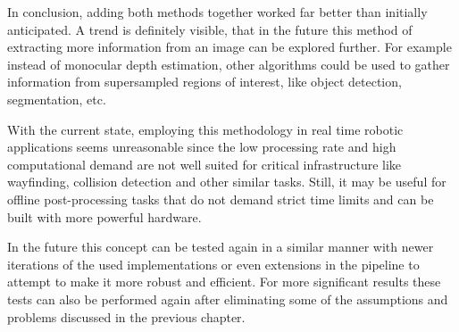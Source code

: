 In conclusion, adding both methods together worked far better than initially anticipated. A trend is definitely visible, that in the future this method of extracting more information from an image can be explored further. For example instead of monocular depth estimation, other algorithms could be used to gather information from supersampled regions of interest, like object detection, segmentation, etc.

With the current state, employing this methodology in real time robotic applications seems unreasonable since the low processing rate and high computational demand are not well suited for critical infrastructure like wayfinding, collision detection and other similar tasks. Still, it may be useful for offline post-processing tasks that do not demand strict time limits and can be built with more powerful hardware.

In the future this concept can be tested again in a similar manner with newer iterations of the used implementations or even extensions in the pipeline to attempt to make it more robust and efficient. For more significant results these tests can also be performed again after eliminating some of the assumptions and problems discussed in the previous chapter.
